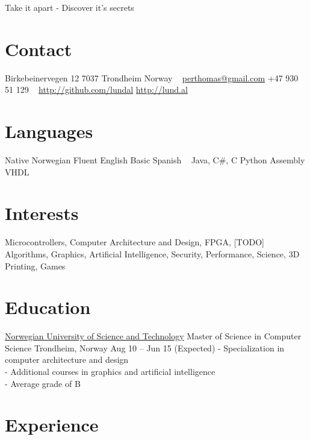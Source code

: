 \documentclass[print]{friggeri-cv}
\begin{document}
       {Take it apart - Discover it's secrets}


\begin{aside}
    \section{Contact}
        Birkebeinervegen 12
        7037 Trondheim
        Norway
        ~
        \href{mailto:perthomas@gmail.com}{perthomas@gmail.com}
        +47 930 51 129
        ~
        \href{http://github.com/lundal}{http://github.com/lundal}
        \href{http://lund.al}{http://lund.al}
    \section{Languages}
        Native Norwegian
        Fluent English
        Basic Spanish
        ~
        Java, C\#, C
        Python
        Assembly
        VHDL
\end{aside}

\section{Interests}

Microcontrollers,
Computer Architecture and Design,
FPGA,
[TODO]
Algorithms,
Graphics,
Artificial Intelligence,
Security,
Performance,
Science,
3D Printing,
Games

\section{Education}

\begin{entrylist}
    \entryx
        {\href{http://ntnu.no/}{Norwegian University of Science and Technology}}
        {Master of Science in Computer Science}
        {Trondheim, Norway}
        {Aug 10 – Jun 15 (Expected)}
        {- Specialization in computer architecture and design\\
         - Additional courses in graphics and artificial intelligence\\
         - Average grade of B}
\end{entrylist}

\section{Experience}
\end{document}

